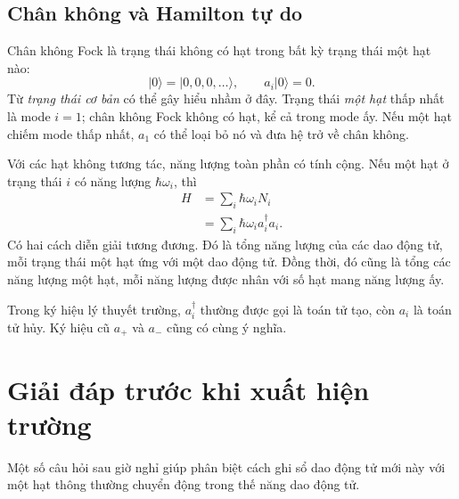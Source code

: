 \subsection{Chân không và Hamilton tự do}

Chân không Fock là trạng thái không có hạt trong bất kỳ trạng thái một hạt nào:
\begin{equation}
|0\rangle=|0,0,0,\ldots\rangle,
\qquad a_i|0\rangle=0.
\end{equation}
Từ \emph{trạng thái cơ bản} có thể gây hiểu nhầm ở đây. Trạng thái \emph{một hạt} thấp nhất là mode \(i=1\); chân không Fock không có hạt, kể cả trong mode ấy. Nếu một hạt chiếm mode thấp nhất, \(a_1\) có thể loại bỏ nó và đưa hệ trở về chân không.

\begin{classroomqa}\end{classroomqa}

Với các hạt không tương tác, năng lượng toàn phần có tính cộng. Nếu một hạt ở trạng thái \(i\) có năng lượng \(\hbar\omega_i\), thì
\begin{align}
H
&=\sum_i \hbar\omega_i N_i \\
&=\sum_i \hbar\omega_i a_i^\dagger a_i.
\label{eq:l06-free-fock-hamiltonian}
\end{align}
Có hai cách diễn giải tương đương. Đó là tổng năng lượng của các dao động tử, mỗi trạng thái một hạt ứng với một dao động tử. Đồng thời, đó cũng là tổng các năng lượng một hạt, mỗi năng lượng được nhân với số hạt mang năng lượng ấy.

Trong ký hiệu lý thuyết trường, \(a_i^\dagger\) thường được gọi là toán tử tạo, còn \(a_i\) là toán tử hủy. Ký hiệu cũ \(a_+\) và \(a_-\) cũng có cùng ý nghĩa.

\section{Giải đáp trước khi xuất hiện trường}

Một số câu hỏi sau giờ nghỉ giúp phân biệt cách ghi sổ dao động tử mới này với một hạt thông thường chuyển động trong thế năng dao động tử.

\begin{classroomqa}\end{classroomqa}

